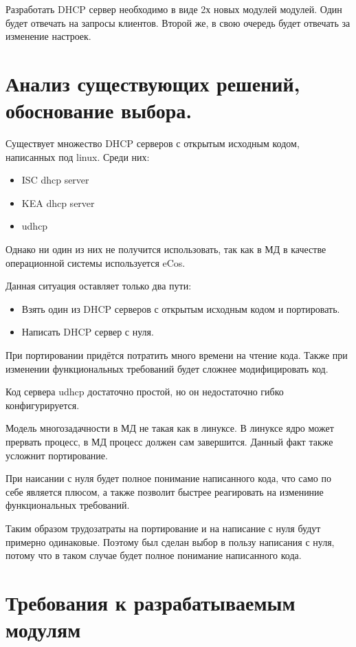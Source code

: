 \documentclass[14pt,a4paper]{extarticle}
\begin{document}
Разработать DHCP сервер необходимо в виде 2х новых модулей модулей.
Один будет отвечать на запросы клиентов.
Второй же, в свою очередь будет отвечать за изменение настроек.

\pagebreak
\section{Анализ существующих решений, обоснование выбора.}

Существует множество DHCP серверов с открытым исходным кодом, написанных под linux. Среди них:
\begin{itemize}
    \item ISC dhcp server
    \item KEA dhcp server
    \item udhcp
\end{itemize}

Однако ни один из них не получится использовать, так как в МД в качестве операционной системы используется eCos.

Данная ситуация оставляет только два пути:

\begin{itemize}
    \item Взять один из DHCP серверов с открытым исходным кодом и портировать.
    \item Написать DHCP сервер с нуля.
\end{itemize}

При портировании придётся потратить много времени на чтение кода.
Также при изменении функциональных требований будет сложнее модифицировать код.

Код сервера udhcp достаточно простой, но он недостаточно гибко конфигурируется.

Модель многозадачности в МД не такая как в линуксе.
В линуксе ядро может прервать процесс, в МД процесс должен сам завершится.
Данный факт также усложнит портирование.

При наисании с нуля будет полное понимание написанного кода, что само по себе является плюсом, а также позволит быстрее реагировать на измениние функциональных требований.

Таким образом трудозатраты на портирование и на написание с нуля будут примерно одинаковые.
Поэтому был сделан выбор в пользу написания с нуля, потому что в таком случае будет полное понимание написанного кода.

\pagebreak
\section{Требования к разрабатываемым модулям}
\end{document}
